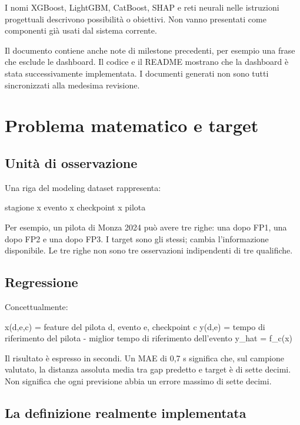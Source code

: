\documentclass[11pt,a4paper]{article}
\newcommand{\code}[1]{{\ttfamily\small\seqsplit{#1}}}
\begin{document}
I nomi XGBoost, LightGBM, CatBoost, SHAP e reti neurali nelle istruzioni progettuali descrivono possibilità o obiettivi. Non vanno presentati come componenti già usati dal sistema corrente.

Il documento \code{reports/model\_card.md} contiene anche note di milestone precedenti, per esempio una frase che esclude le dashboard. Il codice e il README mostrano che la dashboard è stata successivamente implementata. I documenti generati non sono tutti sincronizzati alla medesima revisione.

\section{Problema matematico e target}\label{problema-matematico-e-target}

\subsection{Unità di osservazione}\label{unituxe0-di-osservazione}

Una riga del modeling dataset rappresenta:

\begin{CodeBlock}
stagione x evento x checkpoint x pilota
\end{CodeBlock}

Per esempio, un pilota di Monza 2024 può avere tre righe: una dopo FP1, una dopo FP2 e una dopo FP3. I target sono gli stessi; cambia l'informazione disponibile. Le tre righe non sono tre osservazioni indipendenti di tre qualifiche.

\subsection{Regressione}\label{regressione}

Concettualmente:

\begin{CodeBlock}
x(d,e,c) = feature del pilota d, evento e, checkpoint c
y(d,e)   = tempo di riferimento del pilota - miglior tempo di riferimento dell’evento
y_hat    = f_c(x)
\end{CodeBlock}

Il risultato è espresso in secondi. Un MAE di 0,7 s significa che, sul campione valutato, la distanza assoluta media tra gap predetto e target è di sette decimi. Non significa che ogni previsione abbia un errore massimo di sette decimi.

\subsection{La definizione realmente implementata}\label{la-definizione-realmente-implementata}
\end{document}
